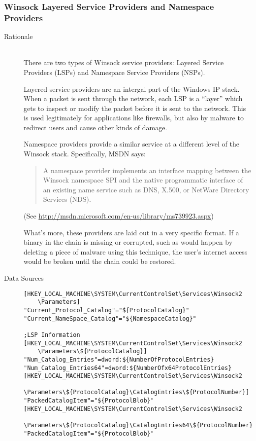\subsubsection{Winsock Layered Service Providers and Namespace Providers}
\begin{description}
\item[Rationale] \hfill \\
There are two types of Winsock service providers: Layered Service Providers
(LSPs) and Namespace Service Providers (NSPs).

Layered service providers are an intergal part of the Windows IP stack. When a
packet is sent through the network, each LSP is a ``layer'' which gets to
inspect or modify the packet before it is sent to the network. This is used
legitimately for applications like firewalls, but also by malware to redirect
users and cause other kinds of damage.

Namespace providers provide a similar service at a different level of the
Winsock stack. Specifically, MSDN says:
\begin{quote}
A namespace provider implements an interface mapping between the Winsock
namespace SPI and the native programmatic interface of an existing name
service such as DNS, X.500, or NetWare Directory Services (NDS).
\end{quote}
(See \url{http://msdn.microsoft.com/en-us/library/ms739923.aspx})

What's more, these providers are laid out in a very specific format. If a binary
in the chain is missing or corrupted, such as would happen by deleting a piece
of malware using this technique, the user's internet access would be broken
until the chain could be restored.
\item[Data Sources] \hfill
\begin{verbatim}
[HKEY_LOCAL_MACHINE\SYSTEM\CurrentControlSet\Services\Winsock2
    \Parameters]
"Current_Protocol_Catalog"="${ProtocolCatalog}"
"Current_NameSpace_Catalog"="${NamespaceCatalog}"

;LSP Information
[HKEY_LOCAL_MACHINE\SYSTEM\CurrentControlSet\Services\Winsock2
    \Parameters\${ProtocolCatalog}]
"Num_Catalog_Entries"=dword:${NumberOfProtocolEntries}
"Num_Catalog_Entries64"=dword:${NumberOfx64ProtocolEntries}
[HKEY_LOCAL_MACHINE\SYSTEM\CurrentControlSet\Services\Winsock2
    \Parameters\${ProtocolCatalog}\CatalogEntries\${ProtocolNumber}]
"PackedCatalogItem"="${ProtocolBlob}"
[HKEY_LOCAL_MACHINE\SYSTEM\CurrentControlSet\Services\Winsock2
    \Parameters\${ProtocolCatalog}\CatalogEntries64\${ProtocolNumber}]
"PackedCatalogItem"="${ProtocolBlob}"


\end{verbatim}
\end{description}
